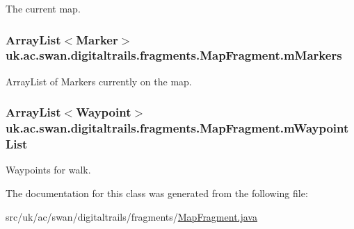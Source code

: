 The current map. 

\hypertarget{classuk_1_1ac_1_1swan_1_1digitaltrails_1_1fragments_1_1_map_fragment_a00d1c005124f882b1b83a6190a6df9b3}{
\subsubsection[{m\+Markers}]{\setlength{\rightskip}{0pt plus 5cm}Array\+List$<$Marker$>$ uk.\+ac.\+swan.\+digitaltrails.\+fragments.\+Map\+Fragment.\+m\+Markers\hspace{0.3cm}{\ttfamily [protected]}}}\label{classuk_1_1ac_1_1swan_1_1digitaltrails_1_1fragments_1_1_map_fragment_a00d1c005124f882b1b83a6190a6df9b3}


Array\+List of Markers currently on the map. 

\hypertarget{classuk_1_1ac_1_1swan_1_1digitaltrails_1_1fragments_1_1_map_fragment_a6c44ef7f0370cc0a699c1cbe80f8c30e}{
\subsubsection[{m\+Waypoint\+List}]{\setlength{\rightskip}{0pt plus 5cm}Array\+List$<${\bf Waypoint}$>$ uk.\+ac.\+swan.\+digitaltrails.\+fragments.\+Map\+Fragment.\+m\+Waypoint\+List\hspace{0.3cm}{\ttfamily [protected]}}}\label{classuk_1_1ac_1_1swan_1_1digitaltrails_1_1fragments_1_1_map_fragment_a6c44ef7f0370cc0a699c1cbe80f8c30e}


Waypoints for walk. 



The documentation for this class was generated from the following file\+:\begin{DoxyCompactItemize}
\item 
src/uk/ac/swan/digitaltrails/fragments/\hyperlink{_map_fragment_8java}{Map\+Fragment.\+java}\end{DoxyCompactItemize}
